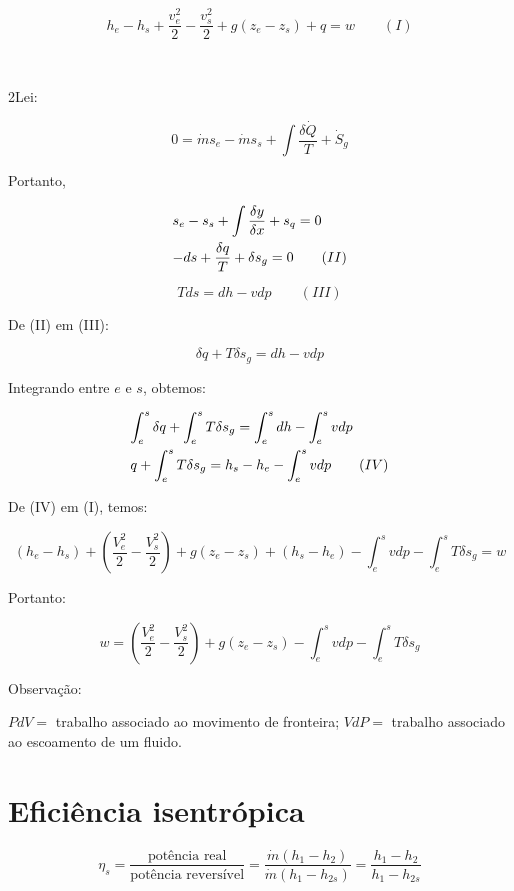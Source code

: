 \[
h_e - h_s + \frac{v_e^2}{2} - \frac{v_s^2}{2} + g(z_e - z_s) + q = w \qquad (I)
\]

\

2\textordfeminine Lei:

\[
0 = \dot m s_e - \dot m s_s + \int {\frac{\delta \dot Q}{T}} + \dot S_g
\]

Portanto,

\[
\begin{gathered}
  s_e - s_s + \int {\frac{\delta y}{\delta x}} + s_q = 0 \hfill \\
  -ds + \frac{\delta q}{T} + \delta s_g = 0 \qquad (II) \hfill \\ 
\end{gathered} 
\]

\[
Tds = dh - vdp \qquad (III)
\]


De (II) em (III):

\[
\delta q + T \delta s_g = dh - vdp
\]

Integrando entre $e$ e $s$, obtemos:

\[
\begin{gathered}
  \int_e^s {\delta q} + \int_e^s {T \delta s_g} = \int_e^s {dh} - \int_e^s {vdp} \hfill \\
  q + \int_e^s {T \delta s_g} = h_s - h_e - \int_e^s {vdp} \qquad (IV) \hfill \\
\end{gathered} 
\]

De (IV) em (I), temos:

\[
(h_e - h_s) + \left( \frac{V_e^2}{2} - \frac{V_s^2}{2} \right) + g(z_e - z_s) + (h_s - h_e) - \int_e^s {vdp} - \int_e^s {T \delta s_g} = w
\]

Portanto:

\[
w = \left( \frac{V_e^2}{2} - \frac{V_s^2}{2} \right) + g(z_e - z_s) - \int_e^s {vdp} - \int_e^s {T \delta s_g}
\]

Observação:

$PdV =$ trabalho associado ao movimento de fronteira;
$VdP =$ trabalho associado ao escoamento de um fluido.

\section{Eficiência isentrópica}


\[
\eta_s = \frac{\text{pot\^encia real}}{\text{pot\^encia revers\'ivel}} = \frac{\dot m (h_1 - h_2)}{\dot m (h_1 - h_{2s})} = \frac{h_1 - h_2}{h_1 - h_{2s}}
\]

